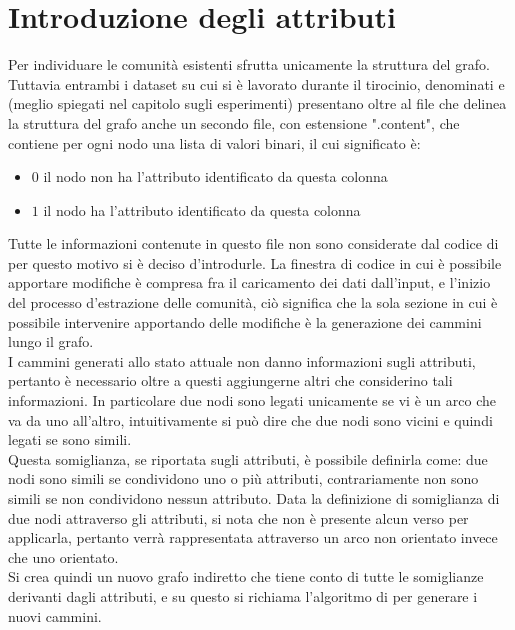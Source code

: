 \section{Introduzione degli attributi}
Per individuare le comunità esistenti \cnrl sfrutta unicamente la struttura del grafo.\\
Tuttavia entrambi i dataset su cui si è lavorato durante il tirocinio, denominati \cora e \citeseer (meglio spiegati nel capitolo sugli esperimenti) presentano oltre al file che delinea la struttura del grafo anche un secondo file, con estensione ".content", che contiene per ogni nodo una lista di valori binari, il cui significato è:
\begin{itemize}
	\item $0$ il nodo non ha l'attributo identificato da questa colonna
	\item $1$ il nodo ha l'attributo identificato da questa colonna
\end{itemize}
%
Tutte le informazioni contenute in questo file non sono considerate dal codice di \cnrl per questo motivo si è deciso d'introdurle. La finestra di codice in cui è possibile apportare modifiche è compresa fra il caricamento dei dati dall'input, e l'inizio del processo d'estrazione delle comunità, ciò significa che la sola sezione in cui è possibile intervenire apportando delle modifiche è la generazione dei cammini lungo il grafo.\\
I cammini generati allo stato attuale non danno informazioni sugli attributi, pertanto è necessario oltre a questi aggiungerne altri che considerino tali informazioni. In particolare due nodi sono legati unicamente se vi è un arco che va da uno all'altro, intuitivamente si può dire che due nodi sono vicini e quindi legati se sono simili.\\
Questa somiglianza, se riportata sugli attributi, è possibile definirla come: due nodi sono simili se condividono uno o più attributi, contrariamente non sono simili se non condividono nessun attributo. Data la definizione di somiglianza di due nodi attraverso gli attributi, si nota che non è presente alcun verso per applicarla, pertanto verrà rappresentata attraverso un arco non orientato invece che uno orientato.\\
Si crea quindi un nuovo grafo indiretto che tiene conto di tutte le somiglianze derivanti dagli attributi, e su questo si richiama l'algoritmo di \nv per generare i nuovi cammini.
%
